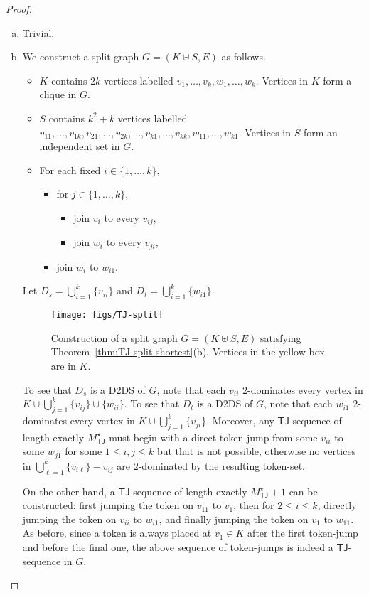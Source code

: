 \documentclass[a4paper]{article}
\theoremstyle{plain}
\theoremstyle{definition}
\newcommand{\sfTJ}{{\mathsf{TJ}}} %
\begin{document}
\begin{proof}
	\begin{enumerate}[(a)]
		\item Trivial.
		\item We construct a split graph $G = (K \uplus S, E)$ as follows. 
		\begin{itemize}
			\item $K$ contains $2k$ vertices labelled $v_1, \dots, v_k, w_1, \dots, w_k$.
			Vertices in $K$ form a clique in $G$.
			
			\item $S$ contains $k^2 + k$ vertices labelled $v_{11}, \dots, v_{1k}, v_{21}, \dots, v_{2k}, \dots, v_{k1}, \dots, v_{kk}, w_{11}, \dots, w_{k1}$.
			Vertices in $S$ form an independent set in $G$.
			
			\item For each fixed $i \in \{1, \dots, k\}$, 
            \begin{itemize}
                \item for $j \in \{1, \dots, k\}$,
                \begin{itemize}
                    \item join $v_i$ to every $v_{ij}$,
                    \item join $w_i$ to every $v_{ji}$,
                \end{itemize}
                \item join $w_i$ to $w_{i1}$.
            \end{itemize}
		\end{itemize}
		Let $D_s = \bigcup_{i=1}^k\{v_{ii}\}$ and $D_t = \bigcup_{i=1}^k\{w_{i1}\}$.
		\begin{figure}[ht]
			\centering
			\texttt{[image: figs/TJ-split]}
			\caption{Construction of a split graph $G = (K \uplus S, E)$ satisfying Theorem~\ref{thm:TJ-split-shortest}(b). Vertices in the yellow box are in $K$.}
			\label{fig:TJ-split}
		\end{figure}
		
		To see that $D_s$ is a D$2$DS of $G$, note that each $v_{ii}$ $2$-dominates every vertex in $K \cup \bigcup_{j=1}^k\{v_{ij}\} \cup \{w_{ii}\}$.
		To see that $D_t$ is a D$2$DS of $G$, note that each $w_{i1}$ $2$-dominates every vertex in $K \cup \bigcup_{j=1}^k\{v_{ji}\}$.
		Moreover, any $\sfTJ$-sequence of length exactly $M^\star_{\sfTJ}$ must begin with a direct token-jump from some $v_{ii}$ to some $w_{j1}$ for some $1 \leq i, j \leq k$ but that is not possible, otherwise no vertices in $\bigcup_{\ell=1}^k\{v_{i\ell}\} - v_{ij}$ are $2$-dominated by the resulting token-set.
		
		On the other hand, a $\sfTJ$-sequence of length exactly $M^\star_{\sfTJ} + 1$ can be constructed: first jumping the token on $v_{11}$ to $v_1$, then for $2 \leq i \leq k$, directly jumping the token on $v_{ii}$ to $w_{i1}$, and finally jumping the token on $v_1$ to $w_{11}$.
		As before, since a token is always placed at $v_1 \in K$ after the first token-jump and before the final one, the above sequence of token-jumps is indeed a $\sfTJ$-sequence in $G$.
	\end{enumerate}
\end{proof}
\end{document}
